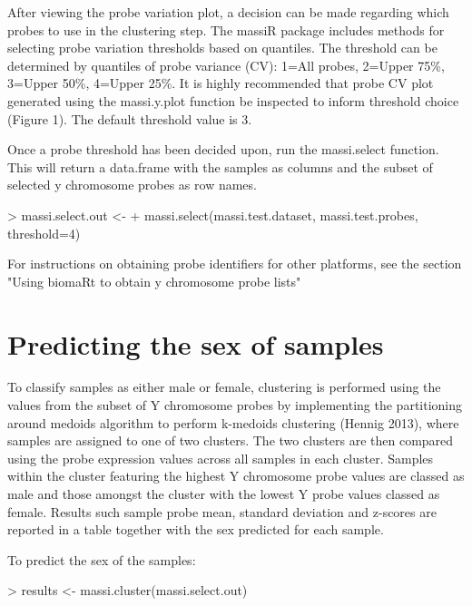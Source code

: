 \documentclass{article}
\begin{document}
After viewing the probe variation plot, a decision can be made regarding which probes to use in the clustering step. The massiR package includes methods for selecting probe variation thresholds based on quantiles. The threshold can be determined by quantiles of probe variance (CV): 1=All probes, 2=Upper 75\%, 3=Upper 50\%, 4=Upper 25\%. It is highly recommended that probe CV plot generated using the massi.y.plot function be inspected to inform threshold choice (Figure 1). The default threshold value is 3.



Once a probe threshold has been decided upon, run the massi.select function. This will return a data.frame with the samples as columns and the subset of selected y chromosome probes as row names.

\begin{Schunk}
\begin{Sinput}
> massi.select.out <- 
+   massi.select(massi.test.dataset, massi.test.probes, threshold=4)
\end{Sinput}
\end{Schunk}

For instructions on obtaining probe identifiers for other platforms, see the section "Using biomaRt to obtain y chromosome probe lists"

\section{Predicting the sex of samples}

To classify samples as either male or female, clustering is performed using the values from the subset of Y chromosome probes  by implementing the partitioning around medoids algorithm to perform k-medoids clustering (Hennig 2013), where samples are assigned to one of two clusters. The two clusters are then compared using the probe expression values across all samples in each cluster. Samples within the cluster featuring the highest Y chromosome probe values are classed as male and those amongst the cluster with the lowest Y probe values classed as female. Results such sample probe mean, standard deviation and z-scores are reported in a table together with the sex predicted for each sample.

To predict the sex of the samples:
\begin{Schunk}
\begin{Sinput}
> results <- massi.cluster(massi.select.out)
\end{Sinput}
\end{Schunk}
\end{document}
